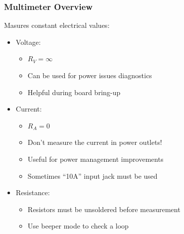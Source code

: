 \begin{frame}
  \frametitle{Multimeter Overview}
  Masures constant electrical values:
  \begin{itemize}
    \item Voltage:
      \begin{itemize}
        \item $ R_V = \infty $
        \item Can be used for power issues diagnostics
        \item Helpful during board bring-up
      \end{itemize}
    \item Current:
      \begin{itemize}
        \item $ R_A = 0 $
        \item \alert{Don't measure the current in power outlets!}
        \item Useful for power management improvements
        \item Sometimes ``10A'' input jack must be used
      \end{itemize}
    \item Resistance:
      \begin{itemize}
        \item Resistors must be unsoldered before measurement
        \item Use beeper mode to check a loop
      \end{itemize}
  \end{itemize}
\end{frame}

